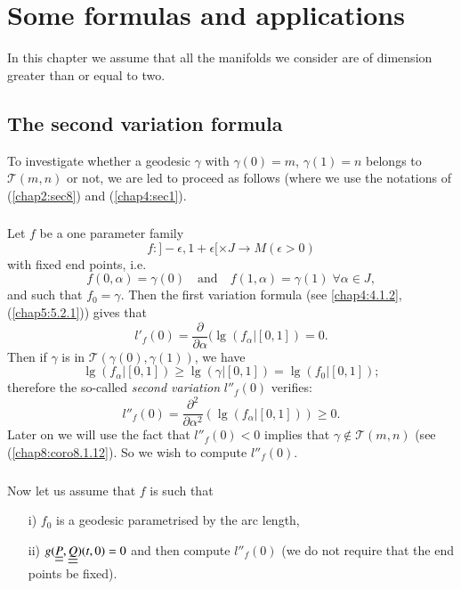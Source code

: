 \chapter{Some formulas and applications}\label{chap8:chap8}

In \pageoriginale this chapter we assume that all the manifolds we
consider are of 
dimension greater than or equal to two.

\section{The second variation formula}\label{chap8:sec1}

To investigate whether a geodesic $\gamma$ with $\gamma(0)=m$,
$\gamma(1)=n$ belongs to $\mathscr{T}(m,n)$ or not, we are led to
proceed as follows (where we use the notations of (\ref{chap2:sec8}) and
(\ref{chap4:sec1}).

\subsection{}\label{chap8:8.1.1}
Let $f$ be a one parameter family
$$
f:]-\epsilon, 1+\epsilon[\times J\to M(\epsilon >0)
$$
with fixed end points, i.e.
$$
f(0,\alpha)=\gamma(0)\quad\text{and}\quad f(1,\alpha)=\gamma(1) \; \forall
\alpha \in J,
$$
and such that $f_{0}=\gamma$. Then the first variation formula (see
\eqref{chap4:4.1.2}, (\ref{chap5:5.2.1})) gives that
$$
l'_{f}(0)=\frac{\partial}{\partial \alpha}(\lg(f_{\alpha}|[0,1])=0.
$$
Then if $\gamma$ is in $\mathscr{T}(\gamma(0),\gamma(1))$, we have
$$
\lg(f_{\alpha}|[0,1])\geq \lg(\gamma|[0,1])=\lg(f_{0}|[0,1]);
$$
therefore the so-called {\em second variation} $l''_{f}(0)$ verifies:
$$
l''_{f}(0)=\frac{\partial^{2}}{\partial
  \alpha^{2}}(\lg(f_{\alpha}|[0,1]))\geq 0.
$$
Later on we will use the fact that $l''_{f}(0)<0$ implies that
$\gamma\not\in \mathscr{T}(m,n)$ (see (\ref{chap8:coro8.1.12}). So we wish to
compute $l''_{f}(0)$.

\subsection{}\label{chap8:8.1.2}\pageoriginale
Now let us assume that $f$ is such that
\begin{itemize}
\item[i)] $f_{0}$ is a geodesic parametrised by the arc length,

\item[ii)] $g(\underline{\underline{P}},\underline{\underline{Q}})(t,0)=0$ and then compute $l''_{f}(0)$
  (we do not require that the end points be fixed).
\end{itemize}

